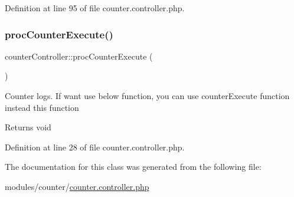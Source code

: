 Definition at line 95 of file counter.\+controller.\+php.

\hypertarget{classcounterController_ab15b7e62975f84fb59f166e65eb79701}{}\label{classcounterController_ab15b7e62975f84fb59f166e65eb79701} 
\subsubsection{\texorpdfstring{proc\+Counter\+Execute()}{procCounterExecute()}}
{\footnotesize\ttfamily counter\+Controller\+::proc\+Counter\+Execute (\begin{DoxyParamCaption}{ }\end{DoxyParamCaption})}

Counter logs. If want use below function, you can use \textquotesingle{}counter\+Execute\textquotesingle{} function instead this function

\begin{DoxyReturn}{Returns}
void 
\end{DoxyReturn}


Definition at line 28 of file counter.\+controller.\+php.



The documentation for this class was generated from the following file\+:\begin{DoxyCompactItemize}
\item 
modules/counter/\hyperlink{counter_8controller_8php}{counter.\+controller.\+php}\end{DoxyCompactItemize}
